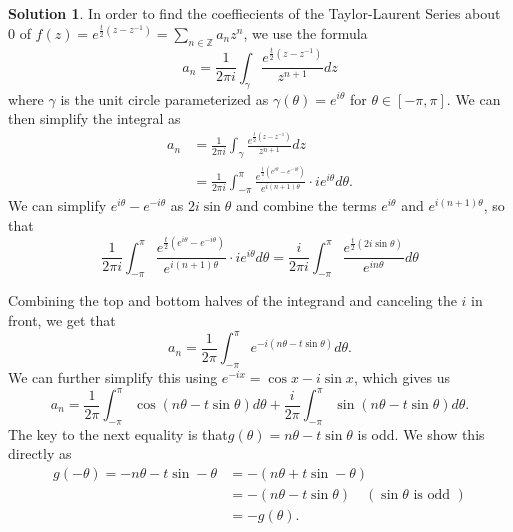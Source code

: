 \documentclass[12pt]{article}
\newcommand{\bbZ}{\mathbb{Z}}
\theoremstyle{definition}
\newtheorem{sol}{Solution}
\theoremstyle{remark}
\begin{document}
\begin{sol}
    In order to find the coeffiecients of the Taylor-Laurent Series about 0 of $f(z) = e^{\frac{t}{2}(z - z^{-1})} = \sum_{n\in\bbZ} a_n z^n$, we use the formula
    \begin{equation}
        a_n = \frac{1}{2\pi i} \int_\gamma \frac{ e^{\frac{t}{2}(z - z^{-1})}}{z^{n+1}} dz
    \end{equation}
    where $\gamma$ is the unit circle parameterized as $\gamma(\theta) = e^{i\theta}$ for $\theta \in [-\pi, \pi]$. We can then simplify the integral as
    \begin{align}
        a_n &= \frac{1}{2\pi i} \int_\gamma \frac{ e^{\frac{t}{2}(z - z^{-1})}}{z^{n+1}} dz\\
            &= \frac{1}{2\pi i} \int_{-\pi}^{\pi} \frac{e^{\frac{t}{2}( e^{i\theta} - e^{-i\theta} )}  }{ e^{i(n+1)\theta} } \cdot ie^{i\theta}d\theta.
    \end{align}
    We can simplify $e^{i\theta} - e^{-i\theta}$ as $2i\sin\theta$ and combine the terms $e^{i\theta}$ and $e^{i(n+1) \theta}$, so that
\begin{equation}
  \frac{1}{2\pi i} \int_{-\pi}^{\pi} \frac{e^{\frac{t}{2}( e^{i\theta} - e^{-i\theta} )}  }{ e^{i(n+1)\theta} } \cdot ie^{i\theta}d\theta = \frac{i}{2\pi i} \int_{-\pi}^{\pi} \frac{e^{\frac{t}{2}( 2i\sin\theta )}  }{ e^{in\theta} } d\theta  
\end{equation}

Combining the top and bottom halves of the integrand and canceling the $i$ in front, we get that
\begin{equation}
    a_n = \frac{1}{2\pi} \int_{-\pi}^\pi e^{-i(n\theta - t\sin\theta)}d\theta.
\end{equation}
We can further simplify this using $e^{-ix} = \cos x - i\sin x$, which gives us
\begin{equation}
    a_n = \frac{1}{2\pi}\int_{-\pi}^\pi \cos ( n\theta - t\sin\theta )d\theta +  \frac{i}{2\pi}\int_{-\pi}^{\pi} \sin( n\theta - t\sin\theta ) d\theta.
\end{equation}
The key to the next equality is that$g(\theta) = n\theta - t\sin\theta$ is odd. We show this directly as
\begin{align}
    g(-\theta) = -n\theta - t\sin-\theta &= - (n\theta +t\sin-\theta)\\
                                         &= - (n\theta -t\sin\theta) \quad (\sin\theta \text{ is odd })\\
                                         &=  - g(\theta).
\end{align}


\end{sol}
\end{document}
